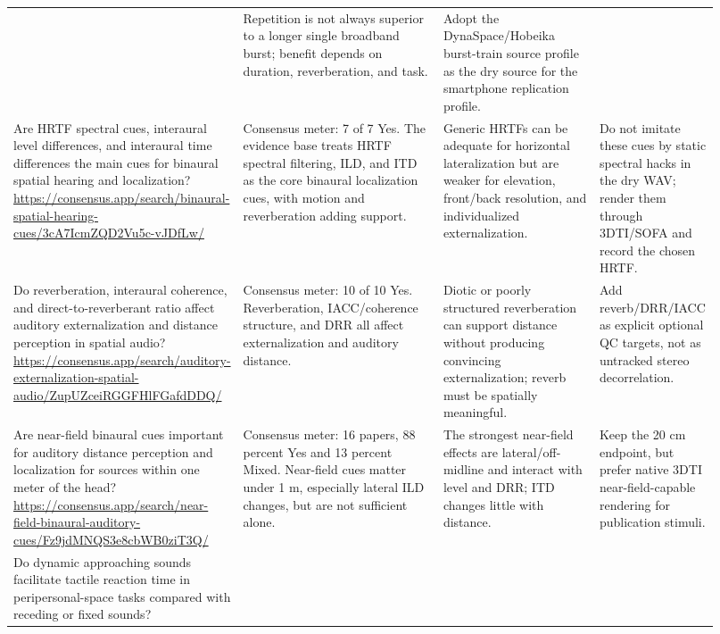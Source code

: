 \begin{longtable}{P{0.21\linewidth} P{0.31\linewidth} P{0.23\linewidth} P{0.17\linewidth}}
& Repetition is not always superior to a longer single broadband burst; benefit depends on duration, reverberation, and task.
& Adopt the DynaSpace/Hobeika burst-train source profile as the dry source for the smartphone replication profile.\\
\addlinespace
Are HRTF spectral cues, interaural level differences, and interaural time differences the main cues for binaural spatial hearing and localization?
\newline\url{https://consensus.app/search/binaural-spatial-hearing-cues/3cA7IcmZQD2Vu5c-vJDfLw/}
& Consensus meter: 7 of 7 Yes. The evidence base treats HRTF spectral filtering, ILD, and ITD as the core binaural localization cues, with motion and reverberation adding support.
& Generic HRTFs can be adequate for horizontal lateralization but are weaker for elevation, front/back resolution, and individualized externalization.
& Do not imitate these cues by static spectral hacks in the dry WAV; render them through 3DTI/SOFA and record the chosen HRTF.\\
\addlinespace
Do reverberation, interaural coherence, and direct-to-reverberant ratio affect auditory externalization and distance perception in spatial audio?
\newline\url{https://consensus.app/search/auditory-externalization-spatial-audio/ZupUZceiRGGFHlFGafdDDQ/}
& Consensus meter: 10 of 10 Yes. Reverberation, IACC/coherence structure, and DRR all affect externalization and auditory distance.
& Diotic or poorly structured reverberation can support distance without producing convincing externalization; reverb must be spatially meaningful.
& Add reverb/DRR/IACC as explicit optional QC targets, not as untracked stereo decorrelation.\\
\addlinespace
Are near-field binaural cues important for auditory distance perception and localization for sources within one meter of the head?
\newline\url{https://consensus.app/search/near-field-binaural-auditory-cues/Fz9jdMNQS3e8cbWB0ziT3Q/}
& Consensus meter: 16 papers, 88 percent Yes and 13 percent Mixed. Near-field cues matter under 1 m, especially lateral ILD changes, but are not sufficient alone.
& The strongest near-field effects are lateral/off-midline and interact with level and DRR; ITD changes little with distance.
& Keep the 20 cm endpoint, but prefer native 3DTI near-field-capable rendering for publication stimuli.\\
\addlinespace
Do dynamic approaching sounds facilitate tactile reaction time in peripersonal-space tasks compared with receding or fixed sounds?

\end{longtable}
